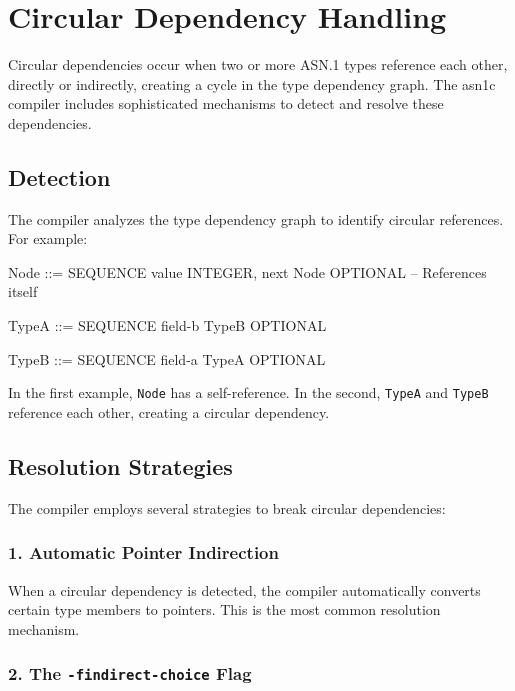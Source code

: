 \documentclass[english,oneside,12pt]{book}
\begin{document}
\section{\label{sec:Circular-Dependencies}Circular Dependency Handling}

Circular dependencies occur when two or more ASN.1 types reference each other, 
directly or indirectly, creating a cycle in the type dependency graph. The asn1c 
compiler includes sophisticated mechanisms to detect and resolve these dependencies.

\subsection*{Detection}

The compiler analyzes the type dependency graph to identify circular references. 
For example:

\begin{asn}
Node ::= SEQUENCE {
    value   INTEGER,
    next    Node OPTIONAL     -- References itself
}

TypeA ::= SEQUENCE {
    field-b TypeB OPTIONAL
}

TypeB ::= SEQUENCE {
    field-a TypeA OPTIONAL
}
\end{asn}

In the first example, \texttt{Node} has a self-reference. In the second, \texttt{TypeA} 
and \texttt{TypeB} reference each other, creating a circular dependency.

\subsection*{Resolution Strategies}

The compiler employs several strategies to break circular dependencies:

\subsubsection*{1. Automatic Pointer Indirection}

When a circular dependency is detected, the compiler automatically converts certain 
type members to pointers. This is the most common resolution mechanism.

\subsubsection*{2. The \texttt{-findirect-choice} Flag}
\end{document}
